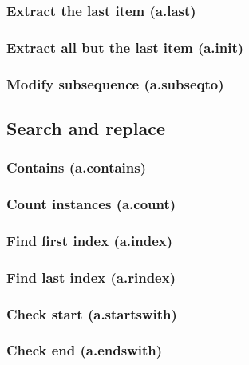 \documentclass{article}
\theoremstyle{definition}
\begin{document}
\subsubsection{Extract the last item (a.last)}

\subsubsection{Extract all but the last item (a.init)}

\subsubsection{Modify subsequence (a.subseqto)}

\subsection{Search and replace}

\subsubsection{Contains (a.contains)}

\subsubsection{Count instances (a.count)}

\subsubsection{Find first index (a.index)}

\subsubsection{Find last index (a.rindex)}

\subsubsection{Check start (a.startswith)}

\subsubsection{Check end (a.endswith)}
\end{document}
